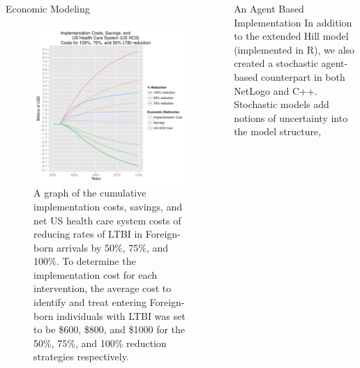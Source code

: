 \documentclass[final]{beamer}
\begin{document}
\begin{frame}
\begin{columns}
\begin{column}{.3\textwidth}
\begin{block}{Economic Modeling}
        \begin{figure}[h]
          \begin{center}
            \includegraphics[scale=1]{EnLTBIRedGroupCost.pdf}
          \end{center}
          \caption{A graph of the cumulative implementation costs, savings, and 
                       net US health care system costs of reducing rates of LTBI in
                       Foreign-born arrivals by 50\%, 75\%, and 100\%.  To determine the 
                       implementation cost for each intervention, the average cost
                       to identify and treat entering Foreign-born individuals with LTBI
                       was set to be \$600, \$800, and \$1000 for the 50\%, 75\%, 
                       and 100\% reduction strategies respectively.}
          \label{fig:redEnLTBI_costs}
        \end{figure}
      \end{block}
    \end{column}
    \begin{column}{.3\textwidth}
      \begin{block}{An Agent Based Implementation}
        In addition to the extended Hill model (implemented in R), we also
        created a stochastic agent-based counterpart in both NetLogo and C++.
        Stochastic models add notions of uncertainty into the model structure,

\end{block}
\end{column}
\end{columns}
\end{frame}
\end{document}

